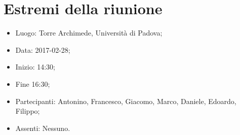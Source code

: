\documentclass[../verbale-2017-02-28.tex]{subfiles}
\begin{document}
\section{Estremi della riunione}
	\begin{itemize}
		\item Luogo: Torre Archimede, Università di Padova;
        \item Data: 2017-02-28;
        \item Inizio: 14:30;
        \item Fine 16:30;
		\item Partecipanti: Antonino, Francesco, Giacomo, Marco, Daniele, Edoardo, Filippo;
        \item Assenti: Nessuno.
	\end{itemize}
\end{document}
